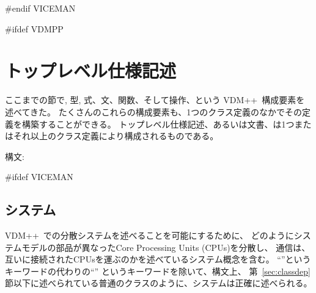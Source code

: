 \documentclass[\pformat,12pt]{jarticle}
\newcommand{\vdmpp}{VDM++}
\begin{document}
#endif VICEMAN

#ifdef VDMPP
%
%


%

\newpage
\section{トップレベル仕様記述}

ここまでの節で, 型, 式、文、関数、そして操作、という \vdmpp\ 構成要素を述べてきた。
たくさんのこれらの構成要素も、1つのクラス定義のなかでその定義を構築することができる。
トップレベル仕様記述、あるいは文書、は1つまたはそれ以上のクラス定義により構成されるものである。

\begin{description}
\item[構文:]
\end{description}

#ifdef VICEMAN
\subsection{システム}\label{sec:system}

\vdmpp\ での分散システムを述べることを可能にするために、
どのようにシステムモデルの部品が異なったCore Processing Units (CPUs)を分散し、
通信は、互いに接続されたCPUsを運ぶのかを述べているシステム概念を含む。
``''というキーワードの代わりの``'' というキーワードを除いて、構文上、
第~\ref{sec:classdep}節以下に述べられている普通のクラスのように、システムは正確に述べられる。
\end{document}
